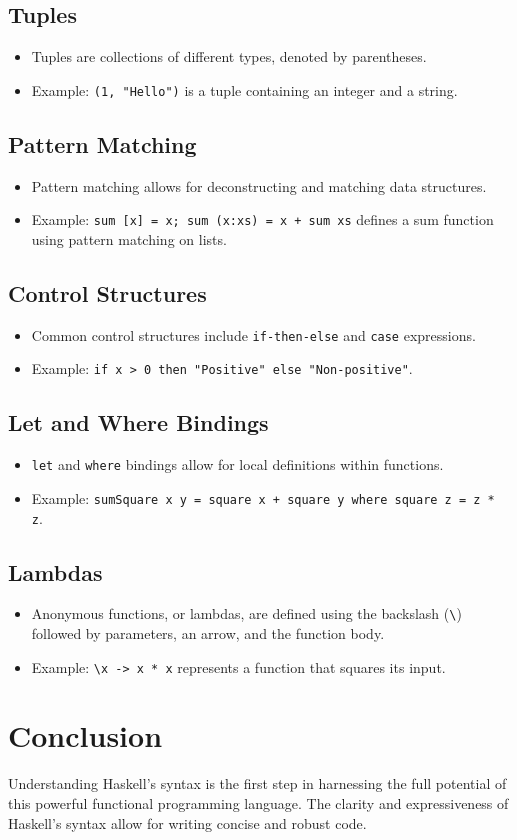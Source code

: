 \subsection{Tuples}
\begin{itemize}
	\item Tuples are collections of different types, denoted by parentheses.
	\item Example: \texttt{(1, "Hello")} is a tuple containing an integer and a string.
\end{itemize}

\subsection{Pattern Matching}
\begin{itemize}
	\item Pattern matching allows for deconstructing and matching data structures.
	\item Example: \texttt{sum [x] = x; sum (x:xs) = x + sum xs} defines a sum function using pattern matching on lists.
\end{itemize}

\subsection{Control Structures}
\begin{itemize}
	\item Common control structures include \texttt{if-then-else} and \texttt{case} expressions.
	\item Example: \texttt{if x > 0 then "Positive" else "Non-positive"}.
\end{itemize}

\subsection{Let and Where Bindings}
\begin{itemize}
	\item \texttt{let} and \texttt{where} bindings allow for local definitions within functions.
	\item Example: \texttt{sumSquare x y = square x + square y where square z = z * z}.
\end{itemize}

\subsection{Lambdas}
\begin{itemize}
	\item Anonymous functions, or lambdas, are defined using the backslash (\texttt{\textbackslash}) followed by parameters, an arrow, and the function body.
	\item Example: \texttt{\textbackslash x -> x * x} represents a function that squares its input.
\end{itemize}

\section{Conclusion}
Understanding Haskell's syntax is the first step in harnessing the full potential of this powerful functional programming language. The clarity and expressiveness of Haskell's syntax allow for writing concise and robust code.
